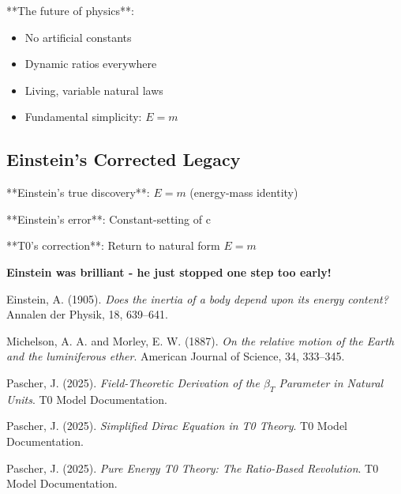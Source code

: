 \documentclass[12pt,a4paper]{article}
\begin{document}
{{{{{{{{{{{{													**The future of physics**:
													\begin{itemize}
														\item No artificial constants
														\item Dynamic ratios everywhere
														\item Living, variable natural laws
														\item Fundamental simplicity: $E = m$
													\end{itemize}
													
													\subsection{Einstein's Corrected Legacy}
													
													**Einstein's true discovery**: $E = m$ (energy-mass identity)
													
													**Einstein's error**: Constant-setting of c
													
													**T0's correction**: Return to natural form $E = m$
													
													\textbf{Einstein was brilliant - he just stopped one step too early!}
													
													\begin{thebibliography}{99}
														Einstein, A. (1905). \textit{Does the inertia of a body depend upon its energy content?} Annalen der Physik, 18, 639--641.
														
														Michelson, A. A. and Morley, E. W. (1887). \textit{On the relative motion of the Earth and the luminiferous ether}. American Journal of Science, 34, 333--345.
														
														Pascher, J. (2025). \textit{Field-Theoretic Derivation of the $\beta_T$ Parameter in Natural Units}. T0 Model Documentation.
														
														Pascher, J. (2025). \textit{Simplified Dirac Equation in T0 Theory}. T0 Model Documentation.
														
														Pascher, J. (2025). \textit{Pure Energy T0 Theory: The Ratio-Based Revolution}. T0 Model Documentation.
														

\end{thebibliography}}}}}}}}}}}}}
\end{document}
